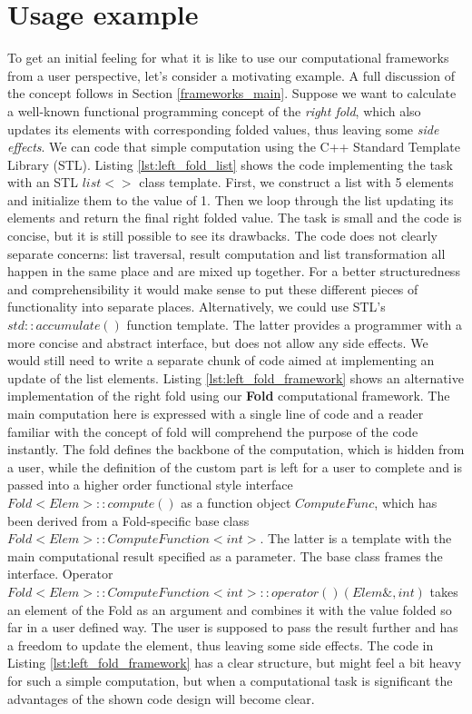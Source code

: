 \section{Usage example}
\label{frameworks_usage_example}
\quad To get an initial feeling for what it is like to use our computational frameworks from a user perspective, let's consider a motivating example. A full discussion of the concept follows in Section \ref{frameworks_main}. Suppose we want to calculate a well-known functional programming concept of the \textit{right fold}, which also updates its elements with corresponding folded values, thus leaving some \textit{side effects}.\newline\null
\quad We can code that simple computation using the C++ Standard Template Library (STL). Listing \ref{lst:left_fold_list} shows the code implementing the task with an STL $list<> $ class template. First, we construct a list with 5 elements and initialize them to the value of 1. Then we loop through the list updating its elements and return the final right folded value. The task is small and the code is concise, but it is still possible to see its drawbacks. The code does not clearly separate concerns: list traversal, result computation and list transformation all happen in the same place and are mixed up together. For a better structuredness and comprehensibility it would make sense to put these different pieces of functionality into separate places. Alternatively, we could use STL's $std::accumulate()$ function template. The latter provides a programmer with a more concise and abstract interface, but does not allow any side effects. We would still need to write a separate chunk of code aimed at implementing an update of the list elements.\newline\null 
\quad Listing \ref{lst:left_fold_framework} shows an alternative implementation of the right fold using our \textbf{Fold} computational framework. The main computation here is expressed with a single line of code and a reader familiar with the concept of fold will comprehend the purpose of the code instantly. The fold defines the backbone of the computation, which is hidden from a user, while the definition of the custom part is left for a user to complete and is passed into a higher order functional style interface $Fold<Elem>::compute()$ as a function object $ComputeFunc$, which has been derived from a Fold-specific base class $Fold<Elem>::ComputeFunction<int>$. The latter is a template with the main computational result specified as a parameter. The base class frames the interface. Operator $Fold<Elem>::ComputeFunction<int>::operator()(Elem\&,int)$ takes an element of the Fold as an argument and combines it with the value folded so far in a user defined way. The user is supposed to pass the result further and has a freedom to update the element, thus leaving some side effects. The code in Listing \ref{lst:left_fold_framework} has a clear structure, but might feel a bit heavy for such a simple computation, but when a computational task is significant the advantages of the shown code design will become clear.

